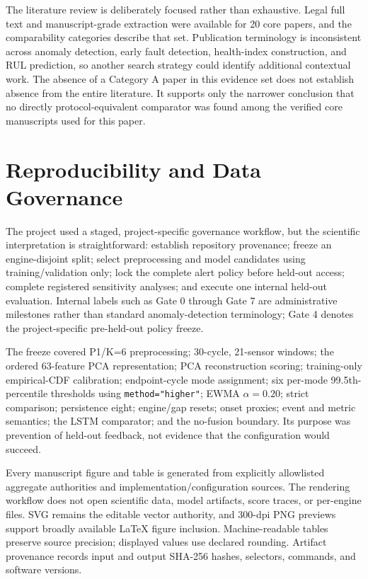 \documentclass[11pt]{article}
\begin{document}
The literature review is deliberately focused rather than exhaustive. Legal full text and manuscript-grade extraction were available for 20 core papers, and the comparability categories describe that set. Publication terminology is inconsistent across anomaly detection, early fault detection, health-index construction, and RUL prediction, so another search strategy could identify additional contextual work. The absence of a Category A paper in this evidence set does not establish absence from the entire literature. It supports only the narrower conclusion that no directly protocol-equivalent comparator was found among the verified core manuscripts used for this paper.


\section{Reproducibility and Data Governance}


The project used a staged, project-specific governance workflow, but the scientific interpretation is straightforward: establish repository provenance; freeze an engine-disjoint split; select preprocessing and model candidates using training/validation only; lock the complete alert policy before held-out access; complete registered sensitivity analyses; and execute one internal held-out evaluation. Internal labels such as Gate 0 through Gate 7 are administrative milestones rather than standard anomaly-detection terminology; Gate 4 denotes the project-specific pre-held-out policy freeze.


The freeze covered P1/K=6 preprocessing; 30-cycle, 21-sensor windows; the ordered 63-feature PCA representation; PCA reconstruction scoring; training-only empirical-CDF calibration; endpoint-cycle mode assignment; six per-mode 99.5th-percentile thresholds using \texttt{method="higher"}; EWMA $\alpha=0.20$; strict comparison; persistence eight; engine/gap resets; onset proxies; event and metric semantics; the LSTM comparator; and the no-fusion boundary. Its purpose was prevention of held-out feedback, not evidence that the configuration would succeed.


Every manuscript figure and table is generated from explicitly allowlisted aggregate authorities and implementation/configuration sources. The rendering workflow does not open scientific data, model artifacts, score traces, or per-engine files. SVG remains the editable vector authority, and 300-dpi PNG previews support broadly available LaTeX figure inclusion. Machine-readable tables preserve source precision; displayed values use declared rounding. Artifact provenance records input and output SHA-256 hashes, selectors, commands, and software versions.
\end{document}
